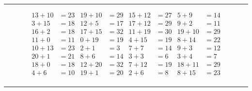 \documentclass{article}
\begin{document}
\begin{sloppy}
\hrule
\begin{align*}
    {13} + {10} &= {23} & {19} + {10} &= {29} & {15} + {12} &= {27} & {5} + {9} &= {14} \\
    {3} + {15} &= {18} & {12} + {5} &= {17} & {17} + {12} &= {29} & {9} + {2} &= {11} \\
    {16} + {2} &= {18} & {17} + {15} &= {32} & {11} + {19} &= {30} & {19} + {10} &= {29} \\
    {11} + {0} &= {11} & {0} + {19} &= {19} & {4} + {15} &= {19} & {8} + {14} &= {22} \\
    {10} + {13} &= {23} & {2} + {1} &= {3} & {7} + {7} &= {14} & {9} + {3} &= {12} \\
    {20} + {1} &= {21} & {8} + {6} &= {14} & {3} + {3} &= {6} & {3} + {4} &= {7} \\
    {18} + {0} &= {18} & {12} + {20} &= {32} & {7} + {12} &= {19} & {18} + {11} &= {29} \\
    {4} + {6} &= {10} & {19} + {1} &= {20} & {2} + {6} &= {8} & {8} + {15} &= {23} \\
\end{align*}
\hrule
\end{sloppy}
\end{document}
